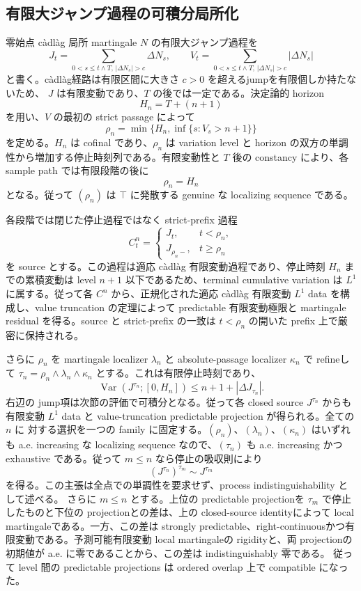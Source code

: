 \subsection{有限大ジャンプ過程の可積分局所化}

零始点 c\`adl\`ag 局所 martingale $N$ の有限大ジャンプ過程を
\[
 J_t=\sum_{0<s\leq t\wedge T,\,|\Delta N_s|>c}\Delta N_s,
 \qquad
 V_t=\sum_{0<s\leq t\wedge T,\,|\Delta N_s|>c}|\Delta N_s|
\]
と書く。càdlàg経路は有限区間に大きさ $c>0$ を超えるjumpを有限個しか持たないため、
$J$ は有限変動であり、$T$ の後では一定である。決定論的 horizon
\[
 H_n=T+(n+1)
\]
を用い、$V$ の最初の strict passage によって
\[
 \rho_n=\min\bigl\{H_n,\inf\{s:V_s>n+1\}\bigr\}
\]
を定める。$H_n$ は cofinal であり、$\rho_n$ は variation level と horizon の双方の単調性から増加する停止時刻列である。有限変動性と $T$ 後の constancy により、各 sample path では有限段階の後に
\[
 \rho_n=H_n
\]
となる。従って $(\rho_n)$ は $\top$ に発散する genuine な localizing sequence である。

各段階では閉じた停止過程ではなく strict-prefix 過程
\[
 C^n_t=
 \begin{cases}
 J_t,&t<\rho_n,\\
 J_{\rho_n-},&t\geq\rho_n
 \end{cases}
\]
を source とする。この過程は適応 càdlàg 有限変動過程であり、停止時刻 $H_n$ までの累積変動は level $n+1$ 以下であるため、terminal cumulative variation は $L^1$ に属する。従って各 $C^n$ から、正規化された適応 càdlàg 有限変動 $L^1$ data を構成し、value truncation の定理によって predictable 有限変動極限と martingale residual を得る。source と strict-prefix の一致は $t<\rho_n$ の開いた prefix 上で厳密に保持される。

さらに $\rho_n$ を martingale localizer
$\lambda_n$ と absolute-passage localizer $\kappa_n$ で refineして
$\tau_n=\rho_n\wedge\lambda_n\wedge\kappa_n$ とする。これは有限停止時刻であり、
\[
 \operatorname{Var}(J^{\tau_n};[0,H_n])
 \le n+1+|\Delta J_{\tau_n}|.
\]
右辺の jump項は次節の評価で可積分となる。従って各 closed source $J^{\tau_n}$ からも
有限変動 $L^1$ data と value-truncation predictable projection が得られる。全ての $n$ に
対する選択を一つの family に固定する。$(\rho_n)$、$(\lambda_n)$、$(\kappa_n)$ はいずれも
a.e. increasing な localizing sequence なので、$(\tau_n)$ も a.e. increasing かつ exhaustive
である。従って $m\le n$ なら停止の吸収則により
\[
  (J^{\tau_n})^{\tau_m}\sim J^{\tau_m}
\]
を得る。この主張は全点での単調性を要求せず、process indistinguishability として述べる。
さらに $m\le n$ とする。上位の predictable projectionを $\tau_m$ で停止したものと下位の
projectionとの差は、上の closed-source identityによって local martingaleである。一方、この差は
strongly predictable、right-continuousかつ有限変動である。予測可能有限変動 local martingaleの
rigidityと、両 projectionの初期値が a.e. に零であることから、この差は indistinguishably 零である。
従って level 間の predictable projections は ordered overlap 上で compatible になった。
